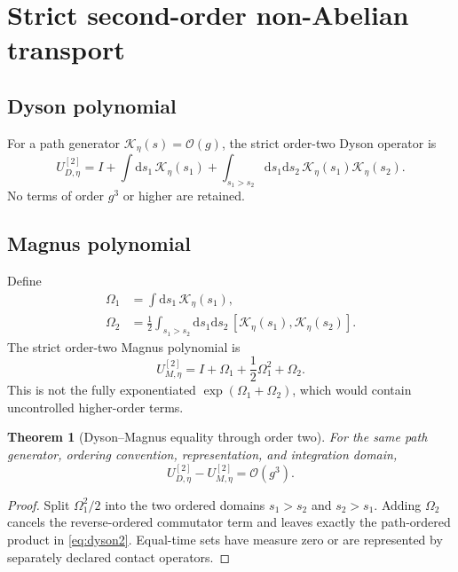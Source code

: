 \documentclass[11pt]{article}
\newtheorem{theorem}[definition]{Theorem}
\newcommand{\dd}{\mathrm{d}}
\newcommand{\cK}{\mathcal K}
\begin{document}
\section{Strict second-order non-Abelian transport}
\label{sec:second-order}

\subsection{Dyson polynomial}

For a path generator \(\cK_\eta(s)=\mathcal O(g)\), the strict order-two
Dyson operator is
\begin{equation}
 U_{D,\eta}^{[2]}
 =I+
 \int\dd s_1\,\cK_\eta(s_1)
 +
 \int_{s_1>s_2}\dd s_1\dd s_2\,
 \cK_\eta(s_1)\cK_\eta(s_2).
 \label{eq:dyson2}
\end{equation}
No terms of order \(g^3\) or higher are retained.

\subsection{Magnus polynomial}

Define
\begin{align}
 \Omega_1
 &=\int\dd s_1\,\cK_\eta(s_1),
 \label{eq:omega1}\\
 \Omega_2
 &=\frac12
 \int_{s_1>s_2}\dd s_1\dd s_2\,
 [\cK_\eta(s_1),\cK_\eta(s_2)].
 \label{eq:omega2}
\end{align}
The strict order-two Magnus polynomial is
\begin{equation}
 U_{M,\eta}^{[2]}
 =I+\Omega_1+\frac12\Omega_1^2+\Omega_2.
 \label{eq:magnus2}
\end{equation}
This is not the fully exponentiated \(\exp(\Omega_1+\Omega_2)\), which would
contain uncontrolled higher-order terms.

\begin{theorem}[Dyson--Magnus equality through order two]
For the same path generator, ordering convention, representation, and
integration domain,
\begin{equation}
 U_{D,\eta}^{[2]}-U_{M,\eta}^{[2]}=\mathcal O(g^3).
 \label{eq:dyson-magnus-equality}
\end{equation}
\end{theorem}

\begin{proof}
Split \(\Omega_1^2/2\) into the two ordered domains \(s_1>s_2\) and
\(s_2>s_1\).  Adding \(\Omega_2\) cancels the reverse-ordered commutator term
and leaves exactly the path-ordered product in \cref{eq:dyson2}.  Equal-time
sets have measure zero or are represented by separately declared contact
operators.
\end{proof}
\end{document}
